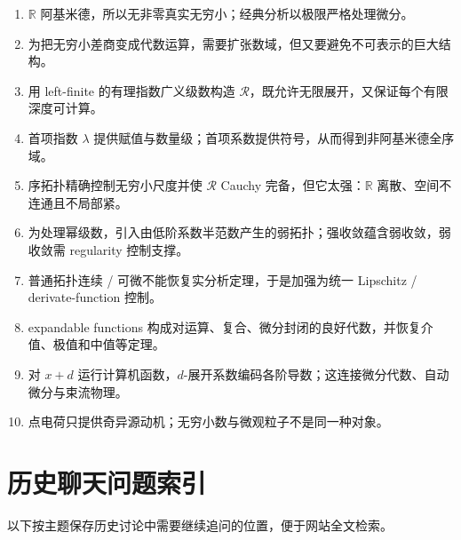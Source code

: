 \documentclass[11pt,a4paper]{article}
\theoremstyle{remark}
\newcommand{\LC}{\mathcal R}
\newcommand{\R}{\mathbb R}
\begin{document}
\begin{enumerate}
\item $\R$ 阿基米德，所以无非零真实无穷小；经典分析以极限严格处理微分。
\item 为把无穷小差商变成代数运算，需要扩张数域，但又要避免不可表示的巨大结构。
\item 用 left-finite 的有理指数广义级数构造 $\LC$，既允许无限展开，又保证每个有限深度可计算。
\item 首项指数 $\lambda$ 提供赋值与数量级；首项系数提供符号，从而得到非阿基米德全序域。
\item 序拓扑精确控制无穷小尺度并使 $\LC$ Cauchy 完备，但它太强：$\R$ 离散、空间不连通且不局部紧。
\item 为处理幂级数，引入由低阶系数半范数产生的弱拓扑；强收敛蕴含弱收敛，弱收敛需 regularity 控制支撑。
\item 普通拓扑连续 / 可微不能恢复实分析定理，于是加强为统一 Lipschitz / derivate-function 控制。
\item expandable functions 构成对运算、复合、微分封闭的良好代数，并恢复介值、极值和中值等定理。
\item 对 $x+d$ 运行计算机函数，$d$-展开系数编码各阶导数；这连接微分代数、自动微分与束流物理。
\item 点电荷只提供奇异源动机；无穷小数与微观粒子不是同一种对象。
\end{enumerate}

\appendix
\section{历史聊天问题索引}

以下按主题保存历史讨论中需要继续追问的位置，便于网站全文检索。
\end{document}
